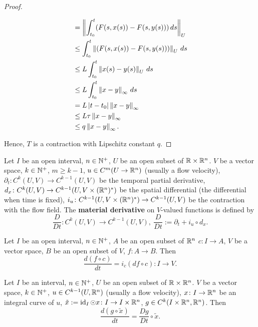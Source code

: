 \begin{proof}
\begin{itemize}
\begin{equation}
\begin{split}
          & = \left\lVert\int_{t_0}^t (F(s, x(s)) - F(s, y(s)))\, d s\right\rVert_U \\
          & \leq \int_{t_0}^t \left\lVert(F(s, x(s)) - F(s, y(s)))\right\rVert_U\, d s \\
          & \leq L \int_{t_0}^t \left\lVert x(s) - y(s)\right\rVert_U\, d s \\
          & \leq L \int_{t_0}^t \left\lVert x - y\right\rVert_\infty\, d s \\
          & = L \left\lvert t - t_0\right\rvert \left\lVert x - y\right\rVert_\infty \\
          & \leq L \tau \left\lVert x - y\right\rVert_\infty \\
          & \leq q \left\lVert x - y\right\rVert_\infty.
        \end{split}
      \end{equation}
  \end{itemize}
  Hence, $T$ is a contraction with Lipschitz constant $q$.
\end{proof}
\begin{definition}
  Let
    $I$ be an open interval,
    $n \in \mathbb{N}^+$,
    $U$ be an open subset of $\mathbb{R} \times \mathbb{R}^n$.
    $V$ be a vector space,
    $k \in \mathbb{N}^+$,
    $m \geq k - 1$,
    $u \in C^m(U \to \mathbb{R}^n)$ (usually a flow velocity),
    $\partial_t \colon C^k(U, V) \to C^{k - 1}(U, V)$
      be the temporal partial derivative,
    $d_x \colon C^k(U, V) \to C^{k - 1}(U, V \times (\mathbb{R}^n)^*)$
      be the spatial differential (the differential when time is fixed),
    $i_u \colon C^{k - 1}(U, V \times (\mathbb{R}^n)^*) \to C^{k - 1}(U, V)$
      be the contraction with the flow field.
  The \textbf{material derivative} on $V$-valued functions is defined by
  \begin{equation}
    \frac{D}{D t} \colon C^k(U, V) \to C^{k - 1}(U, V),\
    \frac{D}{D t} := \partial_t + i_u \circ d_x.
  \end{equation}
\end{definition}
\begin{proposition}
  Let
    $I$ be an open interval,
    $n \in \mathbb{N}^+$,
    $A$ be an open subset of $\mathbb{R}^n$
    $c \colon I \to A$,
    $V$ be a vector space,
    $B$ be an open subset of $V$,
    $f \colon A \to B$.
  Then
  \begin{equation}
    \frac{d(f \circ c)}{d t} = i_{\dot{c}}(d f \circ c) \colon I \to V.
  \end{equation}
\end{proposition}
\begin{proposition}
  \label{proposition:material_derivative_property}
  Let
    $I$ be an interval,
    $n \in \mathbb{N}^+$,
    $U$ be an open subset of $\mathbb{R} \times \mathbb{R}^n$.
    $V$ be a vector space,
    $k \in \mathbb{N}^+$,
    $u \in C^{k - 1}(U, \mathbb{R}^n)$ (usually a flow velocity),
    $x \colon I \to \mathbb{R}^n$ be an integral curve of $u$,
    $\tilde{x} := \mathop{\rm id}\nolimits_I \odot x \colon I \to I \times \mathbb{R}^n$,
    $g \in C^k(I \times \mathbb{R}^n, \mathbb{R}^n)$.
  Then
  \begin{equation}
    \frac{d (g \circ \tilde{x})}{d t} = \frac{D g}{D t} \circ \tilde{x}.
  \end{equation}
\end{proposition}
